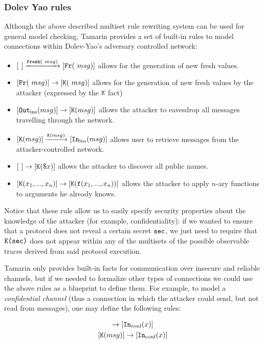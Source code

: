 \documentclass{article}
\newcommand{\mono}[1]{\textrm{\tt #1}}
\begin{document}
\subsubsection{Dolev Yao rules}\label{sec:DolevYaoRules}
Although the above described multiset rule rewriting system can be used for general model checking, Tamarin provides a set of built-in rules to model connections within Dolev-Yao's adversary controlled network:

\begin{itemize}
    \item $[ \ ] \xrightarrow{\mono{Fresh}(~msg)} [ \mono{Fr}(~msg) ]$ allows for the generation of new fresh values.
    \item $[ \mono{Fr}(~msg) ] \to [ \mono{K}(~msg) ]$ allows for the generation of new fresh values by the attacker (expressed by the $\mono{K}$ fact)
    \item $[ \mono{Out}_{\textrm{ins}}(msg) ] \to [ \mono{K}(msg) ]$ allows the attacker to eavesdrop all messages travelling through the network. 
    \item $[ \mono{K}(msg) ] \xrightarrow{\mono{K}(msg)} [ \mono{In}_{\textrm{ins}}(msg) ]$ allows user to retrieve messages from the attacker-controlled network.
    \item $[ \ ] \to [ \mono{K}(\$x) ]$ allows the attacker to discover all public names.
    \item $[ \mono{K}(x_1,...,x_n) ] \to [ \mono{K}(\mono{f}(x_1,...,x_n)) ]$ allows the attacker to apply $n$-ary functions to arguments he already knows.
\end{itemize}

Notice that these rule allow us to easily specify security properties about the knowledge of the attacker (for example, confidentiality): if we wanted to ensure that a protocol does not reveal a certain secret $\mono{sec}$, we just need to require that $\mono{K(sec)}$ does not appear within any of the multisets of the possible observable traces derived from said protocol execution.

Tamarin only provides built-in facts for communication over insecure and reliable channels, but if we needed to formalize other types of connections we could use the above rules as a blueprint to define them. For example, to model a \textit{confidential channel} (thus a connection in which the attacker could send, but not read from messages), one may define the following rules:

\begin{gather*}
    [ \mono{Out}_{\textrm{conf}}(msg)] \to [ \mono{In}_{\textrm{conf}}(x) ]\\
    [ \mono{K}(msg) ] \to [ \mono{In}_{\textrm{conf}}(x) ]
\end{gather*}
\end{document}
